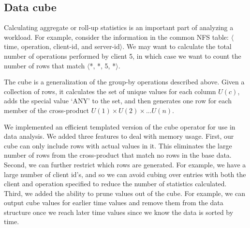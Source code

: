
\subsection{Data cube}

Calculating aggregate or roll-up statistics is an important part of
analyzing a workload.  For example, consider the information in the
common NFS table: $\langle$time, operation, client-id, and
server-id$\rangle$.  We may want to calculate the total number of
operations performed by client 5, in which case we want to count the
number of rows that match $\langle$*, *, 5, *$\rangle$.

The cube\cite{gray97cube} is a generalization of the group-by
operations described above.  Given a collection of rows, it calculates
the set of unique values for each column $U(c)$, adds the special
value `ANY' to the set, and then generates one row for each member of
the cross-product $U(1) \times U(2) \times ... U(n)$.

We implemented an efficient templated version of the cube operator for
use in data analysis.  We added three features to deal with memory
usage.  First, our cube can only include rows with actual values in
it.  This eliminates the large number of rows from the cross-product
that match no rows in the base data.  Second, we can further restrict
which rows are generated.  For example, we have a large number of
client id's, and so we can avoid cubing over entries with both the client
and operation specified to reduce the number of statistics
calculated.  Third, we added the ability to prune values out of the
cube. For example, we can output cube values for earlier time values
and remove them from the data structure once we reach later time
values since we know the data is sorted by time.

